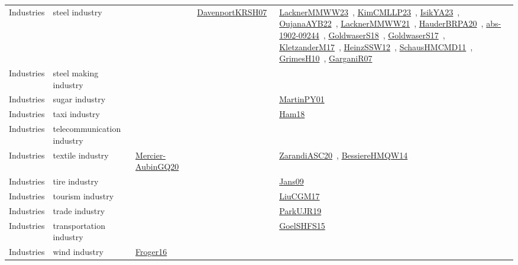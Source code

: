 {\begin{longtable}{lp{3cm}>{\raggedright\arraybackslash}p{6cm}>{\raggedright\arraybackslash}p{6cm}>{\raggedright\arraybackslash}p{8cm}}
Industries & steel industry &  & \href{../works/DavenportKRSH07.pdf}{DavenportKRSH07}~\cite{DavenportKRSH07} & \href{../works/LacknerMMWW23.pdf}{LacknerMMWW23}~\cite{LacknerMMWW23}, \href{../works/KimCMLLP23.pdf}{KimCMLLP23}~\cite{KimCMLLP23}, \href{../works/IsikYA23.pdf}{IsikYA23}~\cite{IsikYA23}, \href{../works/OujanaAYB22.pdf}{OujanaAYB22}~\cite{OujanaAYB22}, \href{../works/LacknerMMWW21.pdf}{LacknerMMWW21}~\cite{LacknerMMWW21}, \href{../works/HauderBRPA20.pdf}{HauderBRPA20}~\cite{HauderBRPA20}, \href{../works/abs-1902-09244.pdf}{abs-1902-09244}~\cite{abs-1902-09244}, \href{../works/GoldwaserS18.pdf}{GoldwaserS18}~\cite{GoldwaserS18}, \href{../works/GoldwaserS17.pdf}{GoldwaserS17}~\cite{GoldwaserS17}, \href{../works/KletzanderM17.pdf}{KletzanderM17}~\cite{KletzanderM17}, \href{../works/HeinzSSW12.pdf}{HeinzSSW12}~\cite{HeinzSSW12}, \href{../works/SchausHMCMD11.pdf}{SchausHMCMD11}~\cite{SchausHMCMD11}, \href{../works/GrimesH10.pdf}{GrimesH10}~\cite{GrimesH10}, \href{../works/GarganiR07.pdf}{GarganiR07}~\cite{GarganiR07}\\
Industries & steel making industry &  &  & \\
Industries & sugar industry &  &  & \href{../works/MartinPY01.pdf}{MartinPY01}~\cite{MartinPY01}\\
Industries & taxi industry &  &  & \href{../works/Ham18.pdf}{Ham18}~\cite{Ham18}\\
Industries & telecommunication industry &  &  & \\
Industries & textile industry & \href{../works/Mercier-AubinGQ20.pdf}{Mercier-AubinGQ20}~\cite{Mercier-AubinGQ20} &  & \href{../works/ZarandiASC20.pdf}{ZarandiASC20}~\cite{ZarandiASC20}, \href{../works/BessiereHMQW14.pdf}{BessiereHMQW14}~\cite{BessiereHMQW14}\\
Industries & tire industry &  &  & \href{../works/Jans09.pdf}{Jans09}~\cite{Jans09}\\
Industries & tourism industry &  &  & \href{../works/LiuCGM17.pdf}{LiuCGM17}~\cite{LiuCGM17}\\
Industries & trade industry &  &  & \href{../works/ParkUJR19.pdf}{ParkUJR19}~\cite{ParkUJR19}\\
Industries & transportation industry &  &  & \href{../works/GoelSHFS15.pdf}{GoelSHFS15}~\cite{GoelSHFS15}\\
Industries & wind industry & \href{../works/Froger16.pdf}{Froger16}~\cite{Froger16} &  & \\
\end{longtable}
}

